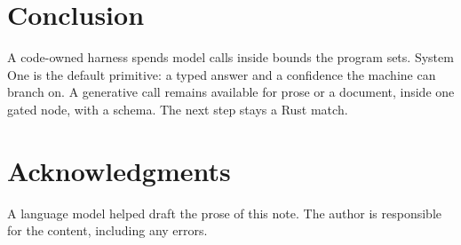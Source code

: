 \documentclass[11pt]{article}
\begin{document}
\section{Conclusion}
\label{sec:conclusion}

A code-owned harness spends model calls inside bounds the program sets.
System One is the default primitive: a typed answer and a confidence the
machine can branch on. A generative call remains available for prose or a
document, inside one gated node, with a schema. The next step stays a Rust
match.

\section*{Acknowledgments}

A language model helped draft the prose of this note. The author is
responsible for the content, including any errors.



\end{document}
